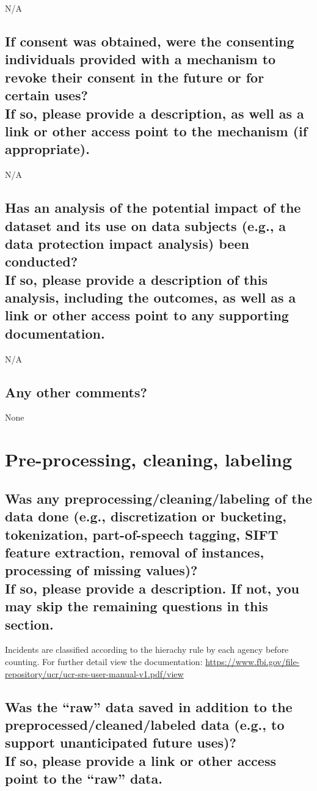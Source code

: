 \documentclass[letterpaper, 10 pt, conference]{ieeeconf}  %
\newcommand{\subtitle}[1]{{\\ \small \normalfont \color{purple} #1}}
\begin{document}
N/A

\subsection{If consent was obtained, were the consenting individuals provided with a mechanism to revoke their consent in the future or for certain uses? \subtitle{If so, please provide a description, as well as a link or other access point to the mechanism (if appropriate).}}

N/A

\subsection{Has an analysis of the potential impact of the dataset and its use on data subjects (e.g., a data protection impact analysis) been conducted? \subtitle{If so, please provide a description of this analysis, including the outcomes, as well as a link or other access point to any supporting documentation.}}

N/A

\subsection{Any other comments?}

None

\section{Pre-processing, cleaning, labeling}

\subsection{Was any preprocessing/cleaning/labeling of the data done (e.g., discretization or bucketing, tokenization, part-of-speech tagging, SIFT feature extraction, removal of instances, processing of missing values)? \subtitle{If so, please provide a description. If not, you may skip the remaining questions in this section.}}

Incidents are classified according to the hierachy rule by each agency before counting. For further detail view the documentation: \href{https://www.fbi.gov/file-repository/ucr/ucr-srs-user-manual-v1.pdf/view}{https://www.fbi.gov/file-repository/ucr/ucr-srs-user-manual-v1.pdf/view}

\subsection{Was the “raw” data saved in addition to the preprocessed/cleaned/labeled data (e.g., to support unanticipated future uses)? \subtitle{If so, please provide a link or other access point to the “raw” data. }}
\end{document}

